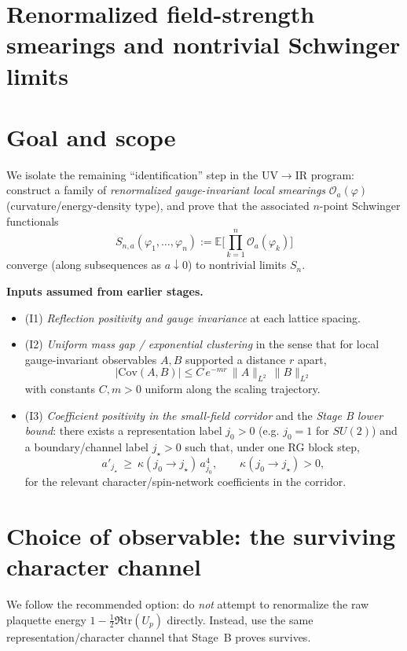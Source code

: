 \documentclass[11pt]{article}
\theoremstyle{definition}
\newcommand{\E}{\mathbb{E}}
\newcommand{\Cov}{\mathrm{Cov}}
\newcommand{\1}{\mathbf{1}}
\begin{document}
\section{Renormalized field-strength smearings and nontrivial Schwinger limits}\label{sec:id}
\section{Goal and scope}
We isolate the remaining ``identification'' step in the UV$\to$IR program:
construct a family of 
\emph{renormalized gauge-invariant local smearings} $\mathcal O_a(\varphi)$ (curvature/energy-density type), and prove that the associated $n$-point Schwinger functionals
\[
S_{n,a}(\varphi_1,\dots,\varphi_n):=\E\Big[\prod_{k=1}^n \mathcal O_a(\varphi_k)\Big]
\]
converge (along subsequences as $a\downarrow 0$) to nontrivial limits $S_n$.

\medskip
\noindent
\textbf{Inputs assumed from earlier stages.}
\begin{itemize}
\item (I1) \emph{Reflection positivity and gauge invariance} at each lattice spacing.
\item (I2) \emph{Uniform mass gap / exponential clustering} in the sense that for local gauge-invariant observables $A,B$ supported a distance $r$ apart,
\begin{equation}\label{eq:expcluster}
|\Cov(A,B)|\le C\,e^{-m r}\,\|A\|_{L^2}\,\|B\|_{L^2}
\end{equation}
with constants $C,m>0$ uniform along the scaling trajectory.
\item (I3) \emph{Coefficient positivity in the small-field corridor} and the \emph{Stage B lower bound}: there exists a representation label $j_0>0$ (e.g. $j_0=1$ for $SU(2)$) and a boundary/channel label $j_\star>0$ such that, under one RG block step,
\begin{equation}\label{eq:stageB}
 a'_{j_\star}\ \ge\ \kappa(j_0\to j_\star)\,a_{j_0}^4,\qquad \kappa(j_0\to j_\star)>0,
\end{equation}
for the relevant character/spin-network coefficients in the corridor.
\end{itemize}

\section{Choice of observable: the surviving character channel}
We follow the recommended option: do \emph{not} attempt to renormalize the raw plaquette energy $1-\tfrac12\Re\mathrm{tr}(U_p)$ directly.
Instead, use the same representation/character channel that Stage~B proves survives.
\end{document}
